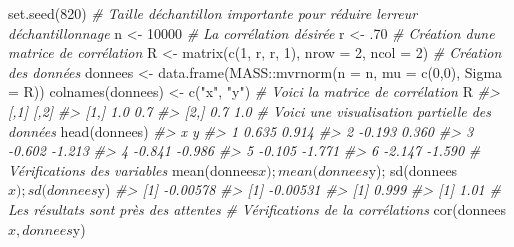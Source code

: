 \documentclass[
]{book}
\newenvironment{Shaded}{}{}
\newcommand{\AttributeTok}[1]{#1}
\newcommand{\CommentTok}[1]{\textit{#1}}
\newcommand{\DecValTok}[1]{#1}
\newcommand{\FunctionTok}[1]{#1}
\newcommand{\NormalTok}[1]{#1}
\newcommand{\OtherTok}[1]{#1}
\newcommand{\SpecialCharTok}[1]{#1}
\newcommand{\StringTok}[1]{#1}
\begin{document}
\begin{Shaded}
\begin{Highlighting}[]
\FunctionTok{set.seed}\NormalTok{(}\DecValTok{820}\NormalTok{)}
\CommentTok{\# Taille d\textquotesingle{}échantillon importante pour réduire l\textquotesingle{}erreur d\textquotesingle{}échantillonnage}
\NormalTok{n }\OtherTok{\textless{}{-}} \DecValTok{10000}
\CommentTok{\# La corrélation désirée}
\NormalTok{r }\OtherTok{\textless{}{-}}\NormalTok{ .}\DecValTok{70}
\CommentTok{\# Création d\textquotesingle{}une matrice de corrélation}
\NormalTok{R }\OtherTok{\textless{}{-}} \FunctionTok{matrix}\NormalTok{(}\FunctionTok{c}\NormalTok{(}\DecValTok{1}\NormalTok{, r, r, }\DecValTok{1}\NormalTok{), }\AttributeTok{nrow =} \DecValTok{2}\NormalTok{, }\AttributeTok{ncol =} \DecValTok{2}\NormalTok{)}
\CommentTok{\# Création des données }
\NormalTok{donnees }\OtherTok{\textless{}{-}} \FunctionTok{data.frame}\NormalTok{(MASS}\SpecialCharTok{::}\FunctionTok{mvrnorm}\NormalTok{(}\AttributeTok{n =}\NormalTok{ n, }\AttributeTok{mu =} \FunctionTok{c}\NormalTok{(}\DecValTok{0}\NormalTok{,}\DecValTok{0}\NormalTok{), }\AttributeTok{Sigma =}\NormalTok{ R))}
\FunctionTok{colnames}\NormalTok{(donnees) }\OtherTok{\textless{}{-}} \FunctionTok{c}\NormalTok{(}\StringTok{"x"}\NormalTok{, }\StringTok{"y"}\NormalTok{)}
\CommentTok{\# Voici la matrice de corrélation}
\NormalTok{R}
\CommentTok{\#\textgreater{}      [,1] [,2]}
\CommentTok{\#\textgreater{} [1,]  1.0  0.7}
\CommentTok{\#\textgreater{} [2,]  0.7  1.0}
\CommentTok{\# Voici une visualisation partielle des données}
\FunctionTok{head}\NormalTok{(donnees)}
\CommentTok{\#\textgreater{}        x      y}
\CommentTok{\#\textgreater{} 1  0.635  0.914}
\CommentTok{\#\textgreater{} 2 {-}0.193  0.360}
\CommentTok{\#\textgreater{} 3 {-}0.602 {-}1.213}
\CommentTok{\#\textgreater{} 4 {-}0.841 {-}0.986}
\CommentTok{\#\textgreater{} 5 {-}0.105 {-}1.771}
\CommentTok{\#\textgreater{} 6 {-}2.147 {-}1.590}
\CommentTok{\# Vérifications des variables}
\FunctionTok{mean}\NormalTok{(donnees}\SpecialCharTok{$}\NormalTok{x); }\FunctionTok{mean}\NormalTok{(donnees}\SpecialCharTok{$}\NormalTok{y); }\FunctionTok{sd}\NormalTok{(donnees}\SpecialCharTok{$}\NormalTok{x); }\FunctionTok{sd}\NormalTok{(donnees}\SpecialCharTok{$}\NormalTok{y)}
\CommentTok{\#\textgreater{} [1] {-}0.00578}
\CommentTok{\#\textgreater{} [1] {-}0.00531}
\CommentTok{\#\textgreater{} [1] 0.999}
\CommentTok{\#\textgreater{} [1] 1.01}
\CommentTok{\# Les résultats sont près des attentes}
\CommentTok{\# Vérifications de la corrélations}
\FunctionTok{cor}\NormalTok{(donnees}\SpecialCharTok{$}\NormalTok{x, donnees}\SpecialCharTok{$}\NormalTok{y)}

\end{Highlighting}
\end{Shaded}
\end{document}
